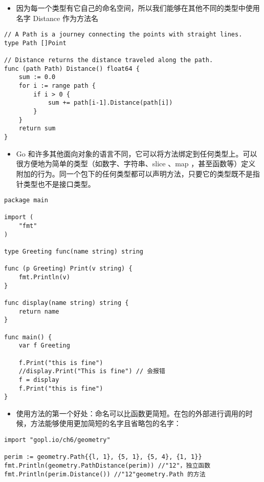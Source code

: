 \begin{itemize}
\tightlist
\item
  因为每一个类型有它自己的命名空间，所以我们能够在其他不同的类型中使用名字
  Distance 作为方法名
\end{itemize}

\begin{verbatim}
// A Path is a journey connecting the points with straight lines.
type Path []Point

// Distance returns the distance traveled along the path.
func (path Path) Distance() float64 {
    sum := 0.0
    for i := range path {
        if i > 0 {
            sum += path[i-1].Distance(path[i])
        }
    }
    return sum
}
\end{verbatim}

\begin{itemize}
\tightlist
\item
  Go
  和许多其他面向对象的语言不同，它可以将方法绑定到任何类型上。可以很方便地为简单的类型（如数字、字符串、slice
  、map
  ，甚至函数等）定义附加的行为。同一个包下的任何类型都可以声明方法，只要它的类型既不是指针类型也不是接口类型。
\end{itemize}

\begin{verbatim}
package main

import (
    "fmt"
)

type Greeting func(name string) string

func (p Greeting) Print(v string) {
    fmt.Println(v)
}

func display(name string) string {
    return name
}

func main() {
    var f Greeting

    f.Print("this is fine")
    //display.Print("This is fine") // 会报错
    f = display
    f.Print("this is fine")
}
\end{verbatim}

\begin{itemize}
\tightlist
\item
  使用方法的第一个好处：命名可以比函数更简短。在包的外部进行调用的时候，方法能够使用更加简短的名字且省略包的名字：
\end{itemize}

\begin{verbatim}
import "gopl.io/ch6/geometry"

perim := geometry.Path{{l, 1}, {5, 1}, {5, 4}, {1, 1}}
fmt.Println(geometry.PathDistance(perim)) //"12"，独立函数
fmt.Println(perim.Distance()) //"12"geometry.Path 的方法
\end{verbatim}

